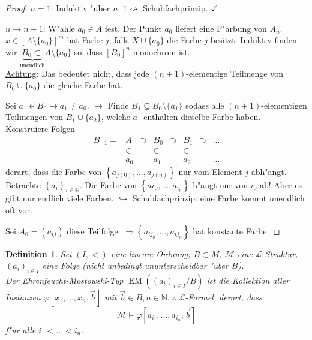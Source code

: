 \documentclass[a4paper,12pt,numbers=noenddot,parskip=full]{scrartcl}
\newcommand{\setN}{\mathbb{N}}
\newcommand{\scrL}{\mathcal{L}}
\newcommand{\scrM}{\mathcal{M}}
\DeclareMathOperator{\EM}{EM}
\theoremstyle{dotless}
\newtheorem{definition}[theorem]{Definition}
\begin{document}
\begin{proof}
	\underline{$n=1$}: Induktiv "uber $n$. $1 \rightsquigarrow$ Schubfachprinzip. $\checkmark$
	
	\underline{$n \rightarrow n+1$}: W"ahle $a_0 \in A$ fest. Der Punkt $a_0$ liefert eine F"arbung von $A_n$. $x \in \left[A \setminus \{a_0\}\right]^m$ hat Farbe $j$, falls $X \cup \{a_0\}$ die Farbe $j$ besitzt. Induktiv finden wir $\underbrace{B_0 \subset}_\text{unendlich} A \setminus \{a_0\}$ so, dass $\left[B_0\right]^n$ monochrom ist.\\
	\underline{Achtung}: Das bedeutet nicht, dass jede $(n+1)$-elementige Teilmenge von $B_0 \cup \{a_0\}$ die gleiche Farbe hat.
	
	Sei $a_1 \in B_0 \longrightarrow a_1 \neq a_0$. $\rightarrow$ Finde $B_1 \subseteq B_0 \setminus \{a_1\}$ sodass alle $(n+1)$-elementigen Teilmengen von $B_1 \cup \{a_2\}$, welche $a_1$ enthalten dieselbe Farbe haben.\\
	Konstruiere Folgen
	\begin{align*}
		B_{-1} = &{A} &\supset &{B_0} &\supset &{B_1} &\supset &\dots\\
		&\in &\phantom\supset &\in &\phantom\supset &\in &\phantom\supset&\phantom{\dots}\\
		&a_0 &\phantom\supset &a_1 &\phantom\supset &a_2 &\phantom\supset &\dots
	\end{align*}
	derart, dass die Farbe von $\left\{a_{j(0)}, \dots, a_{j(n)} \right\}$ nur vom Element $j$ abh"angt.\\
	Betrachte $\left\{a_i\right\}_{i \in \setN}$. Die Farbe von $\left\{a{i_0}, \dots, a_{i_n}\right\}$ h"angt nur von $i_0$ ab! Aber es gibt nur endlich viele Farben. $\hookrightarrow$ Schubfachprinzip: eine Farbe kommt unendlich oft vor.
	
	Sei $A_0 = \left(a_{ij}\right)$ diese Teilfolge. $\Rightarrow \left\{a_{ij_0}, \dots, a_{ij_n}\right\}$ hat konstante Farbe.
\end{proof}
\begin{definition}
	Sei $(I,<)$ eine lineare Ordnung, $B \subset M$, $\scrM$ eine $\scrL$-Struktur, $(a_i)_{i \in I}$ eine Folge (nicht unbedingt ununterscheidbar "uber $B$).\\Der \emph{Ehrenfeucht-Mostowski-Typ} $\EM \left((a_i)_{i \in I}/B\right)$ ist die Kollektion aller Instanzen $\varphi[x_1, \dots, x_n, \vec{b}]$ mit $\vec{b} \in B, n \in \setN, \varphi~ \scrL$-Formel, derart, dass\begin{equation*}
		\scrM \models \varphi[a_{i_1}, \dots, a_{i_n}, \vec{b}]
	\end{equation*}
	f"ur alle $i_1< \dots < i_n$.
\end{definition}
\end{document}
